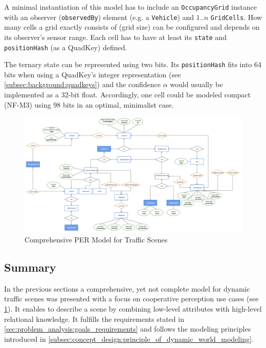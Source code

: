 A minimal instantiation of this model has to include an \texttt{OccupancyGrid} instance with an observer (\texttt{observedBy}) element (e.g. a \texttt{Vehicle}) and  $1..n$ \texttt{GridCells}. How many cells a grid exactly consists of (grid size) can be configured and depends on its observer's sensor range. Each cell has to have at least its \texttt{state} and \texttt{positionHash} (as a QuadKey) defined.

The ternary state can be represented using two bits. Its \texttt{positionHash} fits into 64 bits when using a QuadKey's integer representation (see \cref{subsec:background:quadkeys}) and the confidence $\alpha$ would usually be implemented as a 32-bit float. Accordingly, one cell could be modeled compact (NF-M3) using 98 bits in an optimal, minimalist case.

\begin{figure}
	\centering
	\includegraphics[width=\linewidth]{98_images/scene_representation_er}
	\caption{Comprehensive PER Model for Traffic Scenes}
	\label{fig:final_model}
\end{figure}

\subsection{Summary}
\label{subsec:concept_design:modeling:summary}
In the previous sections a comprehensive, yet not complete model for dynamic traffic scenes was presented with a focus on cooperative perception use cases (see \cref{fig:final_model}). It enables to describe a scene by combining low-level attributes with high-level relational knowledge. It fulfills the requirements stated in \cref{sec:problem_analysis:goals_requirements} and follows the modeling principles introduced in \cref{subsec:concept_design:principle_of_dynamic_world_modeling}. 

